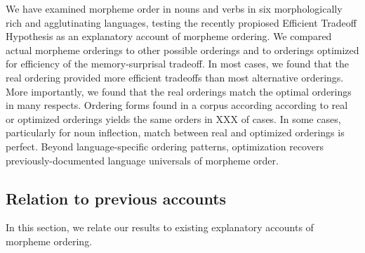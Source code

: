 \documentclass[11pt,letterpaper]{article}
\begin{document}
We have examined morpheme order in nouns and verbs in six morphologically rich and agglutinating languages, testing the recently propiosed Efficient Tradeoff Hypothesis \citep{hahn2020modeling} as an explanatory account of morpheme ordering.
We compared actual morpheme orderings to other possible orderings and to orderings optimized for efficiency of the memory-surprisal tradeoff.
In most cases, we found that the real ordering provided more efficient tradeoffs than most alternative orderings.
More importantly, we found that the real orderings match the optimal orderings in many respects.
Ordering forms found in a corpus according according to real or optimized orderings yields the same orders in XXX of cases.
In some cases, particularly for noun inflection, match between real and optimized orderings is perfect.
Beyond language-specific ordering patterns, optimization recovers previously-documented language universals of morpheme order.

\subsection{Relation to previous accounts}






In this section, we relate our results to existing explanatory accounts of morpheme ordering.

\end{document}
